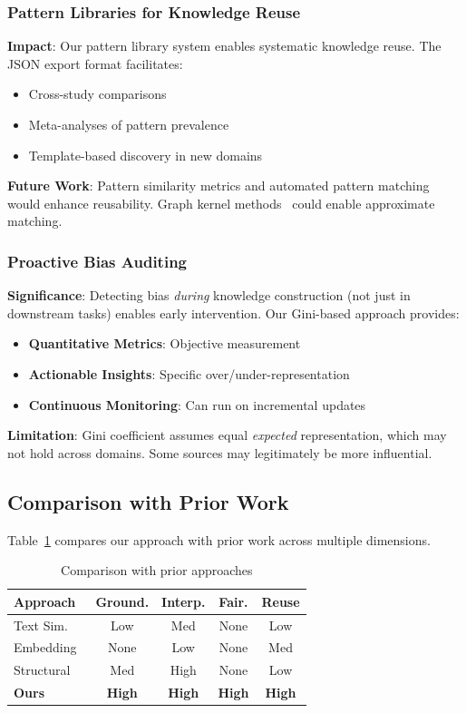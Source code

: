 \documentclass[11pt,twocolumn]{article}
\begin{document}
\subsubsection{Pattern Libraries for Knowledge Reuse}

\textbf{Impact}: Our pattern library system enables systematic knowledge reuse. The JSON export format facilitates:
\begin{itemize}
\item Cross-study comparisons
\item Meta-analyses of pattern prevalence
\item Template-based discovery in new domains
\end{itemize}

\textbf{Future Work}: Pattern similarity metrics and automated pattern matching would enhance reusability. Graph kernel methods~\cite{Placeholder} could enable approximate matching.

\subsubsection{Proactive Bias Auditing}

\textbf{Significance}: Detecting bias \emph{during} knowledge construction (not just in downstream tasks) enables early intervention. Our Gini-based approach provides:
\begin{itemize}
\item \textbf{Quantitative Metrics}: Objective measurement
\item \textbf{Actionable Insights}: Specific over/under-representation
\item \textbf{Continuous Monitoring}: Can run on incremental updates
\end{itemize}

\textbf{Limitation}: Gini coefficient assumes equal \emph{expected} representation, which may not hold across domains. Some sources may legitimately be more influential.

\subsection{Comparison with Prior Work}

Table~\ref{tab:comparison} compares our approach with prior work across multiple dimensions.

\begin{table}[t]
\centering
\caption{Comparison with prior approaches}
\label{tab:comparison}
\begin{tabular}{lcccc}
\toprule
\textbf{Approach} & \textbf{Ground.} & \textbf{Interp.} & \textbf{Fair.} & \textbf{Reuse} \\
\midrule
Text Sim.~\cite{gentner1983structure} & Low & Med & None & Low \\
Embedding~\cite{bordes2013translating} & None & Low & None & Med \\
Structural~\cite{yan2005mining} & Med & High & None & Low \\
\midrule
\textbf{Ours} & \textbf{High} & \textbf{High} & \textbf{High} & \textbf{High} \\
\bottomrule
\end{tabular}
\end{table}
\end{document}
